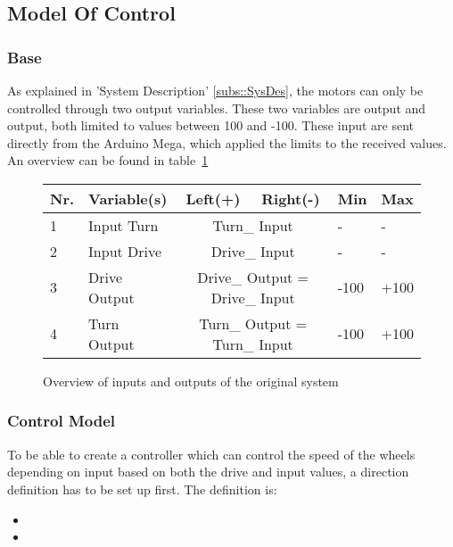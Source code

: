 \subsection{Model Of Control}
\subsubsection{Base}
As explained in 'System Description' \ref{subs::SysDes}, the motors can only be controlled through two output variables.
These two variables are  output and  output, both limited to values between 100 and -100.
These input are sent directly from the Arduino Mega, which applied the limits to the received values.
An overview can be found in table~\ref{tab::varoverview}
\begin{figure}[H]
\begin{tabular}{|l|l|c|c|l|l|}
\hline
\textbf{Nr.} & \textbf{Variable(s)} & \textbf{Left(+)} & \textbf{Right(-)} & \textbf{Min} & \textbf{Max} \\ \hline
1 & Input Turn 	& \multicolumn{2}{c|}{Turn\_ Input} 				& - 		& -		\\ \hline
2 & Input Drive 	& \multicolumn{2}{c|}{Drive\_ Input} 				& - 		& - 		\\ \hline
3 & Drive Output & \multicolumn{2}{c|}{Drive\_ Output = Drive\_ Input}	& -100 	& +100 	\\ \hline
4 & Turn Output 	& \multicolumn{2}{c|}{Turn\_ Output = Turn\_ Input}	& -100	& +100	\\ \hline
\end{tabular}
\caption{Overview of inputs and outputs of the original system}
\label{tab::varoverview}
\end{figure}


\subsubsection{Control Model}
To be able to create a controller which can control the speed of the wheels depending on input based on both the drive and input values, a direction definition has to be set up first.
The definition is:

\begin{itemize}
\item {}
\item {}
\end{itemize}

